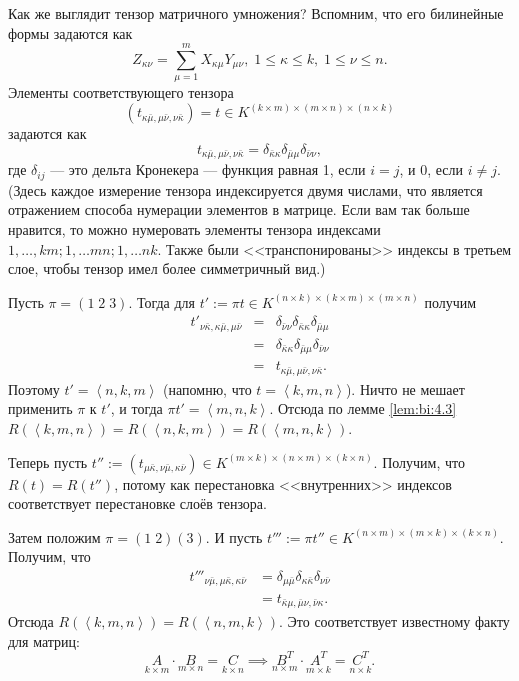 Как же выглядит тензор матричного умножения? Вспомним, что его билинейные формы задаются как
\[\label{matrix_tensor}
	Z_{\kappa \nu} = \sum\limits_{\mu=1}^{m} X_{\kappa \mu} Y_{\mu \nu}, \; 1 \leq \kappa \leq k,\; 1 \leq \nu \leq n.
\]
Элементы соответствующего тензора
\[
	\left( t_{\kappa \bar{\mu}, \mu \bar{\nu}, \nu \bar{\kappa}} \right) = t \in K^{(k \times m) \times (m \times n) \times (n \times k)}
\]
задаются как
\[
	t_{\kappa \bar{\mu}, \mu \bar{\nu}, \nu \bar{\kappa}} = \delta_{\bar{\kappa}\kappa} \delta_{\bar{\mu} \mu} \delta_{\bar{\nu} \nu},
\]
где $\delta_{ij}$ --- это дельта Кронекера --- функция равная 1, если $i=j$, и 0, если $i \neq j$. (Здесь каждое измерение тензора индексируется двумя числами, что является отражением способа нумерации элементов в матрице. Если вам так больше нравится, то можно нумеровать элементы тензора индексами $1, \dotsc, km; 1, \dotsc mn; 1, \dotsc nk$. Также были <<транспонированы>> индексы в третьем слое, чтобы тензор имел более симметричный вид.) 

Пусть $\pi = \left( 1\;2\;3 \right)$. Тогда для $t' := \pi t \in K^{(n \times k) \times (k \times m) \times (m \times n)}$ получим
\[
	\begin{array}{lcl}
		t'_{\nu \bar{\kappa}, \kappa \bar{\mu}, \mu \bar{\nu}  } & = & \delta_{\bar{\nu} \nu} \delta_{\bar{\kappa}\kappa} \delta_{\bar{\mu} \mu} \\
		& = & \delta_{\bar{\kappa}\kappa} \delta_{\bar{\mu} \mu} \delta_{\bar{\nu} \nu}\\
		& = & t_{\kappa \bar{\mu}, \mu \bar{\nu}, \nu \bar{\kappa}   }.
	\end{array}
\]
Поэтому $t' = \left\langle n,k,m \right\rangle$ (напомню, что $t = \left\langle k,m,n \right\rangle$). Ничто не мешает применить $\pi$ к $t'$, и тогда $\pi t' = \left\langle m,n,k \right\rangle$. Отсюда по лемме \ref{lem:bi:4.3} $R \left( \left\langle k, m, n \right\rangle \right) = R \left( \left\langle n, k, m \right\rangle \right) = R \left( \left\langle m, n, k \right\rangle \right)$.

Теперь пусть $t'':=\left( t_{\mu \bar{\kappa}, \nu \bar{\mu}, \kappa \bar{\nu} } \right) \in K^{(m \times k) \times (n \times m) \times (k \times n)}$. Получим, что $R(t)=R(t'')$, потому как перестановка <<внутренних>> индексов соответствует перестановке слоёв тензора.

Затем положим $\pi = (1\;2)(3)$. И пусть $t''':= \pi t'' \in K^{(n \times m) \times (m \times k) \times (k \times n)}$. Получим, что
\begin{align*}
     t'''_{\nu \bar{\mu}, \mu \bar{\kappa}, \kappa \bar{\nu}   } & = \delta_{\mu \bar{\mu} } \delta_{\kappa \bar{\kappa} } \delta_{\nu \bar{\nu} }\\
     & = t_{\bar{\kappa}\mu, \bar{\mu} \nu, \bar{\nu} \kappa}.
\end{align*}
Отсюда $R \left( \left\langle k,m,n \right\rangle \right) = R \left( \left\langle n,m,k \right\rangle \right)$. Это соответствует известному факту для матриц:
\[
	\underset{k \times m}{A} \cdot \underset{m \times n}{B} = \underset{k \times n}{C} \implies \underset{n \times m}{B^T} \cdot \underset{m \times k}{A^T} = \underset{n \times k}{C^T}.
\]

